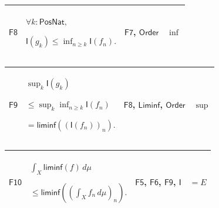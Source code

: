 \documentclass[11pt]{amsart}
\newlength{\FTCFourColumnBody}
\begin{document}
{\begin{tabular}
\end{tabular}%
\par\setlength{\parskip}{0pt}\nointerlineskip
\noindent
\begin{tabular}{|@{}>{\centering\arraybackslash}m{0.078431\FTCFourColumnBody}|>{\centering\arraybackslash}m{0.535947\FTCFourColumnBody}|>{\centering\arraybackslash}m{0.281045\FTCFourColumnBody}|>{\centering\arraybackslash}m{0.104575\FTCFourColumnBody}|}\hline
\hypertarget{proof:F8}{$\displaystyle \textsf{F8}$} & $\displaystyle \forall k:\textsf{PosNat},$\par
$\displaystyle \textsf{I}(g_k)\le\inf_{n\ge k}\textsf{I}(f_n).$ & \hyperlink{proof:F7}{$\displaystyle \textsf{F7}$}, \hyperlink{ax:Order}{$\displaystyle \textsf{Order}$} & $\displaystyle \inf$\\ \hline
\end{tabular}%
\par\setlength{\parskip}{0pt}\nointerlineskip
\noindent
\begin{tabular}{|@{}>{\centering\arraybackslash}m{0.078431\FTCFourColumnBody}|>{\centering\arraybackslash}m{0.535947\FTCFourColumnBody}|>{\centering\arraybackslash}m{0.281045\FTCFourColumnBody}|>{\centering\arraybackslash}m{0.104575\FTCFourColumnBody}|}\hline
\hypertarget{proof:F9}{$\displaystyle \textsf{F9}$} & $\displaystyle \sup_k\textsf{I}(g_k)$\par
$\displaystyle {}\le\sup_k\inf_{n\ge k}\textsf{I}(f_n)$\par
$\displaystyle {}=\textsf{liminf}((\textsf{I}(f_n))_n).$ & \hyperlink{proof:F8}{$\displaystyle \textsf{F8}$}, \hyperlink{def:Liminf}{$\displaystyle \textsf{Liminf}$}, \hyperlink{ax:Order}{$\displaystyle \textsf{Order}$} & $\displaystyle \sup$\\ \hline
\end{tabular}%
\par\setlength{\parskip}{0pt}\nointerlineskip
\noindent
\begin{tabular}{|@{}>{\centering\arraybackslash}m{0.078431\FTCFourColumnBody}|>{\centering\arraybackslash}m{0.535947\FTCFourColumnBody}|>{\centering\arraybackslash}m{0.281045\FTCFourColumnBody}|>{\centering\arraybackslash}m{0.104575\FTCFourColumnBody}|}\hline
\hypertarget{proof:F10}{$\displaystyle \textsf{F10}$} & $\displaystyle \int_X\textsf{liminf}(f)\,d\mu$\par
$\displaystyle {}\le\textsf{liminf}((\int_X f_n\,d\mu)_n).$ & \hyperlink{proof:F5}{$\displaystyle \textsf{F5}$}, \hyperlink{proof:F6}{$\displaystyle \textsf{F6}$}, \hyperlink{proof:F9}{$\displaystyle \textsf{F9}$}, \hyperlink{def:I}{$\displaystyle \textsf{I}$} & $\displaystyle =E$\\ \hline
\end{tabular}%
\par
}
\end{document}
